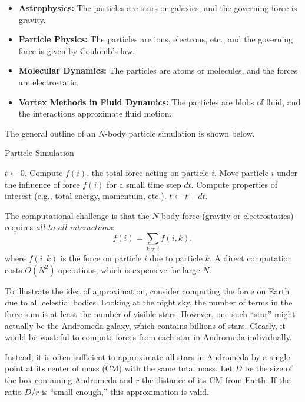 \documentclass[12pt]{book}
\begin{document}
\begin{itemize}
    \item \textbf{Astrophysics:} The particles are stars or galaxies, and the governing force is gravity.
    \item \textbf{Particle Physics:} The particles are ions, electrons, etc., and the governing force is given by Coulomb’s law.
    \item \textbf{Molecular Dynamics:} The particles are atoms or molecules, and the forces are electrostatic.
    \item \textbf{Vortex Methods in Fluid Dynamics:} The particles are blobs of fluid, and the interactions approximate fluid motion.
\end{itemize}

The general outline of an $N$-body particle simulation is shown below.

\begin{algorithm}[H]
\caption{Particle Simulation}
\begin{algorithmic}[1]
\State $t \gets 0$.
     
        \State Compute $f(i)$, the total force acting on particle $i$.
    \EndFor
        \State Move particle $i$ under the influence of force $f(i)$ for a small time step $dt$. 
        \State Compute properties of interest (e.g., total energy, momentum, etc.).
    \EndFor
    \State $t \gets t + dt$.
\EndWhile
\end{algorithmic}
\end{algorithm}

The computational challenge is that the $N$-body force (gravity or electrostatics) requires \textit{all-to-all interactions}:
\[
f(i) = \sum_{k \neq i} f(i,k),
\]
where $f(i,k)$ is the force on particle $i$ due to particle $k$. A direct computation costs $O(N^2)$ operations, which is expensive for large $N$.  

\medskip

To illustrate the idea of approximation, consider computing the force on Earth due to all celestial bodies. Looking at the night sky, the number of terms in the force sum is at least the number of visible stars. However, one such ``star'' might actually be the Andromeda galaxy, which contains billions of stars. Clearly, it would be wasteful to compute forces from each star in Andromeda individually.  

Instead, it is often sufficient to approximate all stars in Andromeda by a single point at its center of mass (CM) with the same total mass. Let $D$ be the size of the box containing Andromeda and $r$ the distance of its CM from Earth. If the ratio $D/r$ is ``small enough,'' this approximation is valid.
\end{document}
